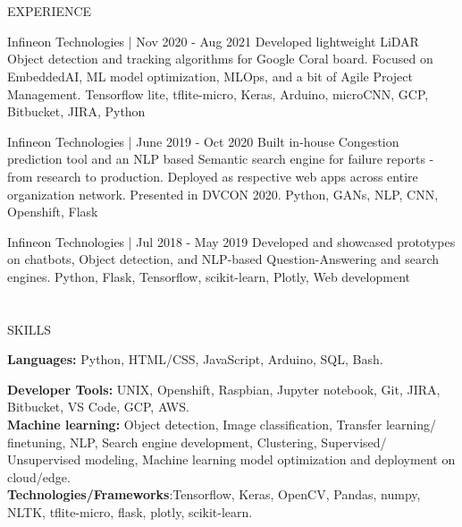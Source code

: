 \documentclass{my_cv}
\begin{document}
\begin{multicols}{2}
\section{\faPencil}{EXPERIENCE}
    
%
    {Infineon Technologies | Nov 2020 - Aug 2021}%
    {Developed lightweight LiDAR Object detection and tracking algorithms for Google Coral board. Focused on EmbeddedAI, ML model optimization, MLOps, and a bit of Agile Project Management.}
    {Tensorflow lite, tflite-micro, Keras, Arduino, microCNN, GCP, Bitbucket, JIRA, Python}

%
    {Infineon Technologies | June 2019 - Oct 2020}%
    {Built in-house Congestion prediction tool and an NLP based Semantic search engine for failure reports - from research to production. Deployed as respective web apps across entire organization network. Presented in DVCON 2020.}%
    {Python, GANs, NLP, CNN, Openshift, Flask }
     
%
    {Infineon Technologies | Jul 2018 - May 2019}%
    {Developed and showcased prototypes on chatbots, Object detection, and NLP-based Question-Answering and search engines.}%
    {Python, Flask, Tensorflow, scikit-learn, Plotly, Web development }
    
    
\section{\faList}{SKILLS}

\textbf{Languages:} Python, HTML/CSS, JavaScript, Arduino, SQL, Bash.

\noindent\textbf{Developer Tools:} UNIX, Openshift, Raspbian, Jupyter notebook, Git, JIRA, Bitbucket, VS Code, GCP, AWS.\\
\noindent\textbf{Machine learning:} Object detection, Image classification, Transfer learning/ finetuning, NLP, Search engine development, Clustering, Supervised/ Unsupervised modeling, Machine learning model optimization and deployment on cloud/edge.\\
\noindent\textbf{Technologies/Frameworks}{:Tensorflow, Keras, OpenCV, Pandas, numpy, NLTK, tflite-micro, flask, plotly, scikit-learn.}
\columnbreak


\end{multicols}
\end{document}
